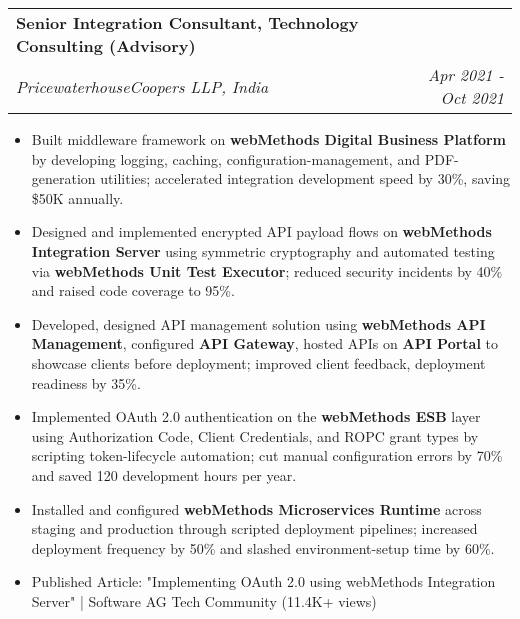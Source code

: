 \documentclass[letterpaper,11pt]{article}
\makeatletter
\newcommand{\resumeItem}[1]{
  \item\small{
    {#1 \vspace{-1pt}}
  }
}
\newcommand{\resumeSubheading}[4]{
  \vspace{-2pt}\item
    \begin{tabular*}{1.0\textwidth}[t]{l@{\extracolsep{\fill}}r}
      \textbf{\large#1} & \textbf{\small #2} \\
      \textit{\large#3} & \textit{\small #4} \\
      
    \end{tabular*}\vspace{-7pt}
}
\newcommand{\resumeItemListStart}{\begin{itemize}[leftmargin=0.1in]}
\newcommand{\resumeItemListEnd}{\end{itemize}\vspace{-5pt}}
\makeatother
\begin{document}
    \resumeSubheading
      {Senior Integration Consultant, Technology Consulting (Advisory)}{} 
      {PricewaterhouseCoopers LLP, India}{Apr 2021 - Oct 2021}
      \resumeItemListStart
            \resumeItem{\normalsize{Built middleware framework on \textbf{webMethods Digital Business Platform} by developing logging, caching, configuration-management, and PDF-generation utilities; accelerated integration development speed by 30\%, saving \$50K annually.}}
            \resumeItem{\normalsize{Designed and implemented encrypted API payload flows on \textbf{webMethods Integration Server} using symmetric cryptography and automated testing via \textbf{webMethods Unit Test Executor}; reduced security incidents by 40\% and raised code coverage to 95\%.}}  
            \resumeItem{\normalsize{Developed, designed API management solution using \textbf{webMethods API Management}, configured \textbf{API Gateway}, hosted APIs on \textbf{API Portal} to showcase clients before deployment; improved client feedback, deployment readiness by 35\%.}}
            \resumeItem{\normalsize{Implemented OAuth 2.0 authentication on the \textbf{webMethods ESB} layer using Authorization Code, Client Credentials, and ROPC grant types by scripting token-lifecycle automation; cut manual configuration errors by 70\% and saved 120 development hours per year.}}  
            \resumeItem{\normalsize{Installed and configured \textbf{webMethods Microservices Runtime} across staging and production through scripted deployment pipelines; increased deployment frequency by 50\% and slashed environment-setup time by 60\%.}}
            \resumeItem{\normalsize{Published Article: "Implementing OAuth 2.0 using webMethods Integration Server" | Software AG Tech Community (11.4K+ views)}}  
      \resumeItemListEnd  
\end{document}
